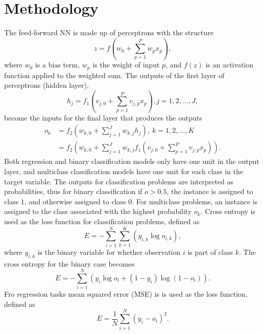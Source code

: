 \documentclass[conference]{IEEEtran}
\begin{document}
	\section{Methodology}
	The feed-forward NN is made up of perceptrons with the structure
	\[z = f\left( w_0 + \sum_{p = 1}^{P} w_p x_p\right),\]
	where $w_0$ is a bias term, $w_p$ is the weight of input $p$, and $f(z)$ is an activation function applied to the weighted sum. The outputs of the first layer of perceptrons (hidden layer),
	\[h_j = f_1\left(v_{j,0} + \sum_{p = 1}^{P} v_{j,p} x_p\right), j = 1, 2 , \ldots, J,\]
	become the inputs for the final layer that produces the outputs
	\begin{align}
		o_k &= f_2\left(w_{k,0} + \sum_{j=1}^{J} w_{k,j} h_j\right), \ k = 1,2,\ldots,K \\
		&= f_2\left(
		w_{k,0} +
		\sum_{j=1}^{J} w_{k,j}
		f_1\left(
		v_{j,0} + \sum_{p=1}^{P} v_{j,p} x_p
		\right)
		\right).
	\end{align}
	Both regression and binary classification models only have one unit in the output layer, and multiclass classification models have one unit for each class in the target variable. The outputs for classification problems are interpreted as probabilities, thus for binary classification if $o > 0.5$, the instance is assigned to class $1$, and otherwise assigned to class $0$. For multiclass problems, an instance is assigned to the class associated with the highest probability $o_k$. Cross entropy is used as the loss function for classification problems, defined as
	\[E = -\sum_{i=1}^{N} \sum_{k=1}^{K} (y_{i, k} \log o_{i, k}),\]
	where $y_{i, k}$ is the binary variable for whether observation $i$ is part of class $k$. The cross entropy for the binary case becomes
	\[E = -\sum_{i=1}^{N} (y_i \log o_i + (1 - y_i) \log (1 - o_i)).\]
	Fro regression tasks mean squared error (MSE) is is used as the loss function, defined as 
	\[E = \frac{1}{N} \sum_{i=1}^{N} (y_i - o_i)^2.\]
	
\end{document}
